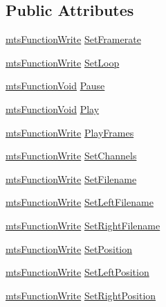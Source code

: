 \subsection*{Public Attributes}
\begin{DoxyCompactItemize}
\item 
\hyperlink{classmts_function_write}{mts\-Function\-Write} \hyperlink{class_i_req_filter_source_video_file_a96c23fb93b4bd2edee6c76811abdce66}{Set\-Framerate}
\item 
\hyperlink{classmts_function_write}{mts\-Function\-Write} \hyperlink{class_i_req_filter_source_video_file_af4f7763123ecd5a66edccc5e43b8e08e}{Set\-Loop}
\item 
\hyperlink{classmts_function_void}{mts\-Function\-Void} \hyperlink{class_i_req_filter_source_video_file_af210b57e7d5e22a3375e6cd082caaf97}{Pause}
\item 
\hyperlink{classmts_function_void}{mts\-Function\-Void} \hyperlink{class_i_req_filter_source_video_file_a235bca8cf38c48322edb1209b0c0f0fc}{Play}
\item 
\hyperlink{classmts_function_write}{mts\-Function\-Write} \hyperlink{class_i_req_filter_source_video_file_a0f0b0ba0aa55c40882a5b73181fb4b2f}{Play\-Frames}
\item 
\hyperlink{classmts_function_write}{mts\-Function\-Write} \hyperlink{class_i_req_filter_source_video_file_a1ac352d3e583b8eb2298bb40cee04f1a}{Set\-Channels}
\item 
\hyperlink{classmts_function_write}{mts\-Function\-Write} \hyperlink{class_i_req_filter_source_video_file_ac5769880cb2ebf714d2d645eebf74fbd}{Set\-Filename}
\item 
\hyperlink{classmts_function_write}{mts\-Function\-Write} \hyperlink{class_i_req_filter_source_video_file_a2f00d1dbc4ced344f5015a81dce5e11b}{Set\-Left\-Filename}
\item 
\hyperlink{classmts_function_write}{mts\-Function\-Write} \hyperlink{class_i_req_filter_source_video_file_a96cb4f97ea9bed7c68b2faf9aedec210}{Set\-Right\-Filename}
\item 
\hyperlink{classmts_function_write}{mts\-Function\-Write} \hyperlink{class_i_req_filter_source_video_file_a975749712b4d2563c6a119e3dba3efc2}{Set\-Position}
\item 
\hyperlink{classmts_function_write}{mts\-Function\-Write} \hyperlink{class_i_req_filter_source_video_file_a262ebe15b7028a6a067f6dfda502b8fe}{Set\-Left\-Position}
\item 
\hyperlink{classmts_function_write}{mts\-Function\-Write} \hyperlink{class_i_req_filter_source_video_file_a684875f3ca7a3080dc0f033dec576fa3}{Set\-Right\-Position}

\end{DoxyCompactItemize}
